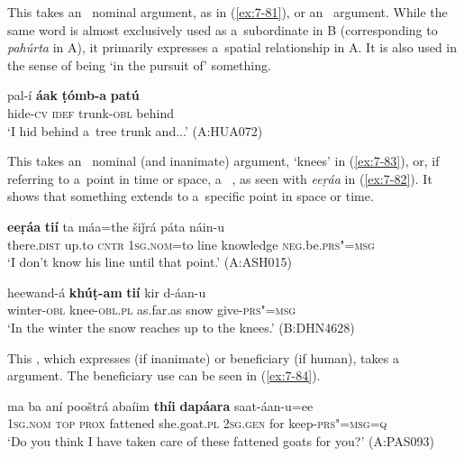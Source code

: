 \begin{exe}
 This  takes an~ nominal argument, as in (\ref{ex:7-81}), or an~  argument. While the same word is almost exclusively used as a~subordinate  in B (corresponding to \textit{pahúrta} in A), it primarily expresses a~spatial relationship in A. It is also used in the sense of being `in the pursuit of' something.

\begin{exe}
\ex
\label{ex:7-81}
\gll pal-í \textbf{áak} \textbf{ṭómb-a} \textbf{patú} \\
hide-\textsc{cv} \textsc{idef} trunk-\textsc{obl} behind \\
\glt `I hid behind a~tree trunk and...' (A:HUA072)
\end{exe}


 This  takes an~ nominal (and inanimate) argument, `knees' in (\ref{ex:7-83}), or, if referring to a~point in time or space, a~ , as seen with \textit{eeṛáa} in (\ref{ex:7-82}). It shows that something extends to a~specific point in space or time. 

\begin{exe}
\ex
\label{ex:7-82}
\gll \textbf{eeṛáa} \textbf{tií} ta máa=the šiǰrá páta náin-u \\
there.\textsc{dist} up.to \textsc{cntr} \textsc{1sg.nom}=to line knowledge \textsc{neg}.be.\textsc{prs"=msg} \\
\glt `I don't know his line until that point.' (A:ASH015)
\end{exe}
\begin{exe}
\ex
\label{ex:7-83}
\gll heewand-á \textbf{khúṭ-am} \textbf{tií} kir d-áan-u \\
winter-\textsc{obl} knee-\textsc{obl.pl} as.far.as snow give-\textsc{prs"=msg}  \\
\glt `In the winter the snow reaches up to the knees.' (B:DHN4628)
\end{exe}

 This , which expresses  (if inanimate) or beneficiary (if human), takes a~ argument. The beneficiary use can be seen in (\ref{ex:7-84}).

\ea
\label{ex:7-84}
\gll ma ba aní pooštrá abaíim \textbf{thíi} \textbf{dapáara} saat-áan-u=ee\\
\textsc{1sg.nom} \textsc{top} \textsc{prox} fattened she.goat.\textsc{pl} \textsc{2sg.gen} for keep-\textsc{prs"=msg=q}\\
\glt `Do you think I have taken care of these fattened goats for you?' (A:PAS093)
\z


\end{exe}
